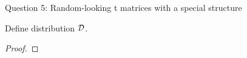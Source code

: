 \begin{solution}{Question 5: Random-looking t matrices with a special structure}\label{ques:5}
    \begin{question}
    Define distribution $\mathcal{D}$.
    \end{question}
    \tcblower{}
    \begin{proof}
    
    \end{proof}
\end{solution}
